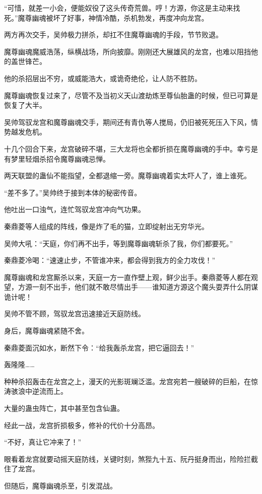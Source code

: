 \begin{this_body}
“可惜，就差一小会，便能奴役了这头传奇荒兽。哼！方源，你这是主动来找死。”魔尊幽魂被坏了好事，神情冷酷，杀机勃发，再度冲向龙宫。

两方再次交手，吴帅极力拼杀，却扛不住魔尊幽魂的手段，节节败退。

魔尊幽魂魔威浩荡，纵横战场，所向披靡。刚刚还大展雄风的龙宫，也难以阻挡他的盖世锋芒。

他的杀招层出不穷，或威能浩大，或诡奇绝伦，让人防不胜防。

魔尊幽魂恢复过来了，尽管不及当初义天山渡劫炼至尊仙胎蛊的时候，但已可算是恢复了大半。

吴帅驾驭龙宫和魔尊幽魂交手，期间还有青仇等人搅局，仍旧被死死压入下风，情势越发危机。

十几个回合下来，龙宫破碎不堪，三大龙将也全都折损在魔尊幽魂的手中。幸亏是有梦里轻烟杀招令魔尊幽魂忌惮。

两天联盟的蛊仙不能指望，全都退缩一旁。魔尊幽魂着实太吓人了，谁上谁死。

“差不多了。”吴帅终于接到本体的秘密传音。

他吐出一口浊气，连忙驾驭龙宫冲向气功果。

秦鼎菱等人组成的阵线，像是炸了毛的猫，立即绽射出无穷华光。

吴帅大吼：“天庭，你们再不出手，等到魔尊幽魂斩杀了我，你们都要死。”

秦鼎菱冷喝：“速速止步，不管谁冲来，都会得到我方的全力攻伐！”

魔尊幽魂和龙宫厮杀以来，天庭一方一直作壁上观，鲜少出手。秦鼎菱等人都在观望，方源一刻不出手，他们就不敢尽情出手——谁知道方源这个魔头耍弄什么阴谋诡计呢！

吴帅不管不顾，驾驭龙宫迅速接近天庭防线。

身后，魔尊幽魂紧随不舍。

秦鼎菱面沉如水，断然下令：“给我轰杀龙宫，把它逼回去！”

轰隆隆……

种种杀招轰击在龙宫之上，漫天的光影斑斓泛滥。龙宫宛若一艘破碎的巨船，在惊涛骇浪中逆流而上。

大量的蛊虫阵亡，其中甚至包含仙蛊。

经此一战，龙宫折损极多，修补的代价十分高昂。

“不好，真让它冲来了！”

眼看着龙宫就要动摇天庭防线，关键时刻，煞狴九十五、阮丹挺身而出，险险拦截住了龙宫。

但随后，魔尊幽魂杀至，引发混战。


\end{this_body}
